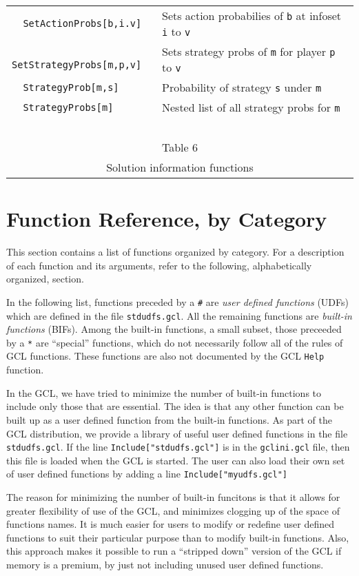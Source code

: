 \begin{table}[htp]
\begin{center}
\begin{tabular} {|l||l|}
\verb+  SetActionProbs[b,i.v]+ & Sets action probabilies of \verb+b+ at infoset \verb+i+ to \verb+v+\\
\verb+  SetStrategyProbs[m,p,v]+ & Sets strategy probs of \verb+m+ for
player \verb+p+ to \verb+v+\\
\verb+  StrategyProb[m,s]+ & Probability of strategy \verb+s+ under \verb+m+ \\
\verb+  StrategyProbs[m]+ & Nested list of all strategy probs for \verb+m+\\
\hline
\multicolumn{2}{c}{\ }\\
\multicolumn{2}{c}{Table 6}\\
\multicolumn{2}{c}{Solution information functions}\\
\end{tabular}
\end{center}
\end{table}
\medskip


\chapter{Function Reference, by Category}

This section contains a list of functions organized by
category.  For a description of each function and its arguments,
refer to the following, alphabetically organized, section.  

In the following list, functions preceded by a \verb+#+ are {\it user
defined functions} (UDFs) which are defined in the file
\verb+stdudfs.gcl+.  All the remaining functions are {\it built-in
functions} (BIFs).  Among the built-in functions, a small subset,
those preceeded by a \verb+*+ are ``special'' functions, which do not
necessarily follow all of the rules of GCL functions.  These functions
are also not documented by the GCL \verb+Help+ function.  

In the GCL, we have tried to minimize the number of built-in functions
to include only those that are essential.  The idea is that any other
function can be built up as a user defined function from the built-in
functions.  As part of the GCL distribution, we provide a library of
useful user defined functions in the file \verb+stdudfs.gcl+.  If the
line \verb+Include["stdudfs.gcl"]+ is in the \verb+gclini.gcl+ file,
then this file is loaded when the GCL is started.  The user can also
load their own set of user defined functions by adding a line
\verb+Include["myudfs.gcl"]+

The reason for minimizing the number of built-in funcitons is that it
allows for greater flexibility of use of the GCL, and minimizes
clogging up of the space of functions names.  It is much easier for
users to modify or redefine user defined functions to suit their
particular purpose than to modify built-in functions.  Also, this
approach makes it possible to run a ``stripped down'' version of the
GCL if memory is a premium, by just not including unused user defined
functions.

